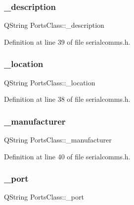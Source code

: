 \subsubsection{\texorpdfstring{\_description}{\_description}}
{\footnotesize\ttfamily Q\+String Ports\+Class\+::\+\_\+description\hspace{0.3cm}{\ttfamily [private]}}



Definition at line 39 of file serialcomms.\+h.

\mbox{\label{classPortsClass_a09cafbfc55f5da779cb33d7ab9a5d963}} 
\subsubsection{\texorpdfstring{\_location}{\_location}}
{\footnotesize\ttfamily Q\+String Ports\+Class\+::\+\_\+location\hspace{0.3cm}{\ttfamily [private]}}



Definition at line 38 of file serialcomms.\+h.

\mbox{\label{classPortsClass_af8437a5a02dd31176ddc1fab5860c5fe}} 
\subsubsection{\texorpdfstring{\_manufacturer}{\_manufacturer}}
{\footnotesize\ttfamily Q\+String Ports\+Class\+::\+\_\+manufacturer\hspace{0.3cm}{\ttfamily [private]}}



Definition at line 40 of file serialcomms.\+h.

\mbox{\label{classPortsClass_a7b2aa52c2875846c58e565bed33df8cc}} 
\subsubsection{\texorpdfstring{\_port}{\_port}}
{\footnotesize\ttfamily Q\+String Ports\+Class\+::\+\_\+port\hspace{0.3cm}{\ttfamily [private]}}



